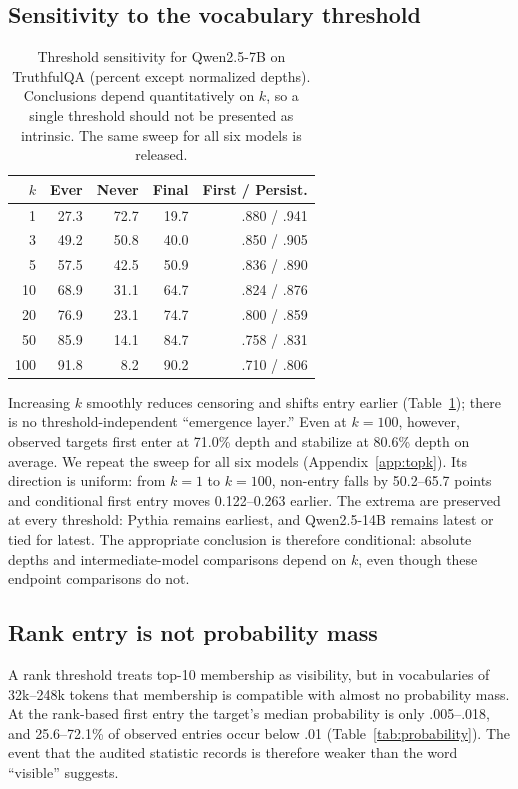 \documentclass[11pt]{article}
\begin{document}
\subsection{Sensitivity to the vocabulary threshold}
\begin{table}[t]
\centering\small
\begin{tabular}{rrrrr}
\toprule
$k$ & Ever & Never & Final & First / Persist. \\
\midrule
1   & 27.3 & 72.7 & 19.7 & .880 / .941 \\
3   & 49.2 & 50.8 & 40.0 & .850 / .905 \\
5   & 57.5 & 42.5 & 50.9 & .836 / .890 \\
10  & 68.9 & 31.1 & 64.7 & .824 / .876 \\
20  & 76.9 & 23.1 & 74.7 & .800 / .859 \\
50  & 85.9 & 14.1 & 84.7 & .758 / .831 \\
100 & 91.8 & 8.2  & 90.2 & .710 / .806 \\
\bottomrule
\end{tabular}
\caption{Threshold sensitivity for Qwen2.5-7B on TruthfulQA (percent except normalized depths). Conclusions depend quantitatively on $k$, so a single threshold should not be presented as intrinsic. The same sweep for all six models is released.}
\label{tab:topk}
\end{table}

Increasing $k$ smoothly reduces censoring and shifts entry earlier (Table~\ref{tab:topk}); there is no threshold-independent ``emergence layer.'' Even at $k=100$, however, observed targets first enter at 71.0\% depth and stabilize at 80.6\% depth on average. We repeat the sweep for all six models (Appendix~\ref{app:topk}). Its direction is uniform: from $k{=}1$ to $k{=}100$, non-entry falls by 50.2--65.7 points and conditional first entry moves 0.122--0.263 earlier. The extrema are preserved at every threshold: Pythia remains earliest, and Qwen2.5-14B remains latest or tied for latest. The appropriate conclusion is therefore conditional: absolute depths and intermediate-model comparisons depend on $k$, even though these endpoint comparisons do not.

\subsection{Rank entry is not probability mass}
\label{sec:probability}
A rank threshold treats top-10 membership as visibility, but in vocabularies of 32k--248k tokens that membership is compatible with almost no probability mass. At the rank-based first entry the target's median probability is only .005--.018, and 25.6--72.1\% of observed entries occur below .01 (Table~\ref{tab:probability}). The event that the audited statistic records is therefore weaker than the word ``visible'' suggests.
\end{document}
